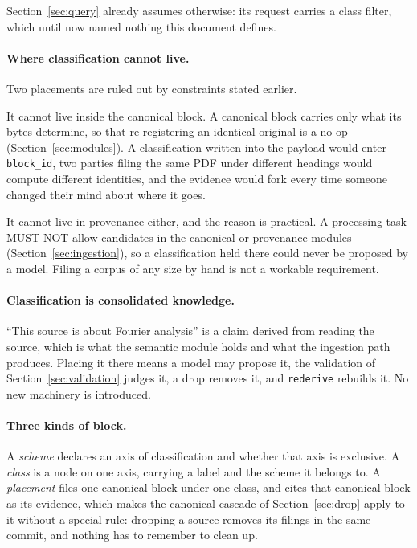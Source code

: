 \documentclass[11pt,a4paper]{article}
\begin{document}
Section~\ref{sec:query} already assumes otherwise: its request carries a class
filter, which until now named nothing this document defines.

\paragraph{Where classification cannot live.}
Two placements are ruled out by constraints stated earlier.

It cannot live inside the canonical block. A canonical block carries only what
its bytes determine, so that re-registering an identical original is a no-op
(Section~\ref{sec:modules}). A classification written into the payload would
enter \texttt{block\_id}, two parties filing the same PDF under different
headings would compute different identities, and the evidence would fork every
time someone changed their mind about where it goes.

It cannot live in provenance either, and the reason is practical. A processing
task MUST NOT allow candidates in the canonical or provenance modules
(Section~\ref{sec:ingestion}), so a classification held there could never be
proposed by a model. Filing a corpus of any size by hand is not a workable
requirement.

\paragraph{Classification is consolidated knowledge.}
``This source is about Fourier analysis'' is a claim derived from reading the
source, which is what the semantic module holds and what the ingestion path
produces. Placing it there means a model may propose it, the
validation of Section~\ref{sec:validation} judges it, a drop removes it, and
\texttt{rederive} rebuilds it. No new machinery is introduced.

\paragraph{Three kinds of block.}
A \emph{scheme} declares an axis of classification and whether that axis is
exclusive. A \emph{class} is a node on one axis, carrying a label and the scheme
it belongs to. A \emph{placement} files one canonical block under one class, and cites that canonical block as its evidence, which makes the canonical
cascade of Section~\ref{sec:drop} apply to it without a special rule: dropping a
source removes its filings in the same commit, and nothing has to remember to
clean up.
\end{document}
